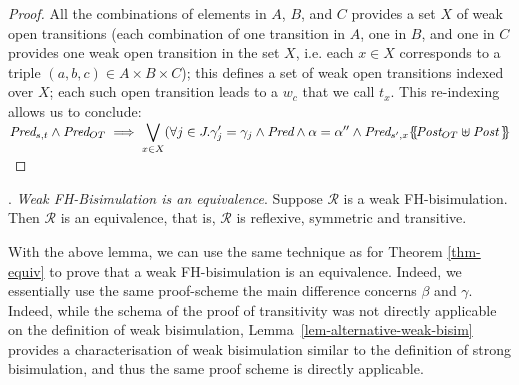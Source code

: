 \documentclass{lmcs}
\begin{document}
\begin{proof}
All the combinations of elements in $A$, $B$, and $C$ provides a set $X$ of weak open transitions (each combination of one transition in $A$, one in $B$, and one in $C$ provides one weak open transition in the set $X$, i.e. each $x\in X$ corresponds to a triple $(a,b,c)\in A\times B\times C$); this defines a set of weak open transitions indexed over $X$;  each such open transition leads to a $w_c$ that we call $t_x$. This re-indexing allows us to conclude:\\
$\Pred_{s,t} \land \Pred_{OT}\implies
 \displaystyle{\bigvee_{x\in X}} 
(\forall j\in J.\gamma_j'=\gamma_j \land  \Pred \land \alpha=\alpha''  \land \Pred_{s',x}\subst{\Post_{OT}\uplus\Post\,}$\\
\end{proof}


\fussy
{}. \emph{Weak FH-Bisimulation is an equivalence}.
 Suppose $\mathcal{R}$ 
is a weak FH-bisimulation. Then $\mathcal{R}$ is an equivalence, that is, $\mathcal{R}$ is 
reflexive, symmetric and transitive.
\sloppy

With the above lemma, we can use the same technique as for Theorem \ref{thm-equiv}  to prove that a weak FH-bisimulation is an equivalence. Indeed, we essentially use the same proof-scheme the main difference concerns  $\beta$ and  $\gamma$. Indeed, while the schema of the proof of transitivity was not directly applicable on the definition of weak bisimulation,  Lemma~\ref{lem-alternative-weak-bisim} provides a characterisation of weak bisimulation similar to the definition of strong bisimulation, and thus the same proof scheme is directly applicable.

 

       		



       		
\end{document}
